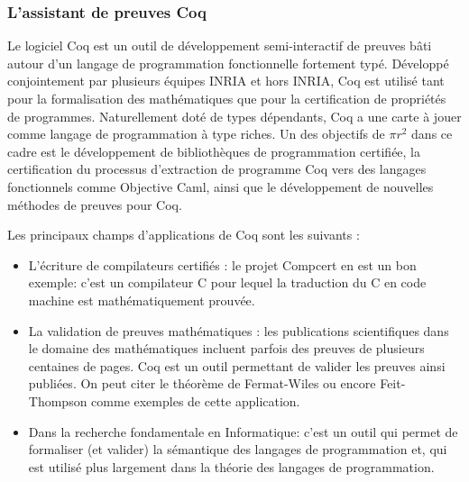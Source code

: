 \documentclass[a4paper, 11pt]{report}
\newcommand{\pir}[0]{\textbf{$\pi r^2$}\xspace}
\begin{document}
      \subsubsection{L'assistant de preuves Coq}
      Le logiciel Coq est un outil de développement semi-interactif de
      preuves bâti autour d'un langage de programmation fonctionnelle
      fortement typé. Développé conjointement par plusieurs équipes INRIA et
      hors INRIA, Coq est utilisé tant pour la formalisation des
      mathématiques que pour la certification de propriétés de programmes.
      Naturellement doté de types dépendants, Coq a une carte à jouer comme
      langage de programmation à type riches. Un des objectifs de \pir dans
      ce cadre est le développement de bibliothèques de programmation
      certifiée, la certification du processus d'extraction de programme Coq
      vers des langages fonctionnels comme Objective Caml, ainsi que le
      développement de nouvelles méthodes de preuves pour Coq.

      Les principaux champs d'applications de Coq sont les suivants :
      \begin{itemize}
        \item L'écriture de compilateurs certifiés : le projet Compcert en
          est un bon exemple: c'est un compilateur C pour lequel la traduction
          du C en code machine est mathématiquement prouvée.
        \item La validation de preuves mathématiques : les publications
          scientifiques dans le domaine des mathématiques incluent parfois
          des preuves de plusieurs centaines de pages. Coq est un outil
          permettant de valider les preuves ainsi publiées. On peut citer
          le théorème de Fermat-Wiles ou encore Feit-Thompson comme exemples
          de cette application.
        \item Dans la recherche fondamentale en Informatique: c'est un outil
          qui permet de formaliser (et valider) la sémantique des langages de
          programmation et, qui est utilisé plus largement dans la théorie
          des langages de programmation.
      \end{itemize}
\end{document}

